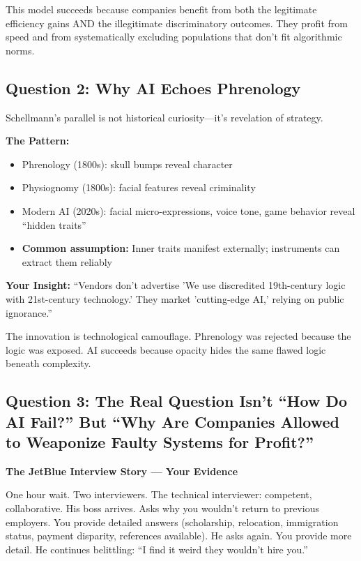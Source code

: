 \documentclass[12pt,letterpaper]{article}
\begin{document}
This model succeeds because companies benefit from both the legitimate efficiency gains AND the illegitimate discriminatory outcomes. They profit from speed and from systematically excluding populations that don't fit algorithmic norms.

\subsection{Question 2: Why AI Echoes Phrenology}

Schellmann's parallel is not historical curiosity—it's revelation of strategy.

\begin{keyfindings}
\textbf{The Pattern:}
\begin{itemize}[leftmargin=*,noitemsep,font=\small]
    \item Phrenology (1800s): skull bumps reveal character
    \item Physiognomy (1800s): facial features reveal criminality
    \item Modern AI (2020s): facial micro-expressions, voice tone, game behavior reveal ``hidden traits''
    \item \textbf{Common assumption:} Inner traits manifest externally; instruments can extract them reliably
\end{itemize}
\end{keyfindings}

\textbf{Your Insight:} ``Vendors don't advertise 'We use discredited 19th-century logic with 21st-century technology.' They market 'cutting-edge AI,' relying on public ignorance.''

The innovation is technological camouflage. Phrenology was rejected because the logic was exposed. AI succeeds because opacity hides the same flawed logic beneath complexity.

\subsection{Question 3: The Real Question Isn't ``How Do AI Fail?'' But ``Why Are Companies Allowed to Weaponize Faulty Systems for Profit?''}

\textbf{The JetBlue Interview Story --- Your Evidence}

One hour wait. Two interviewers. The technical interviewer: competent, collaborative. His boss arrives. Asks why you wouldn't return to previous employers. You provide detailed answers (scholarship, relocation, immigration status, payment disparity, references available). He asks again. You provide more detail. He continues belittling: ``I find it weird they wouldn't hire you.''
\end{document}
